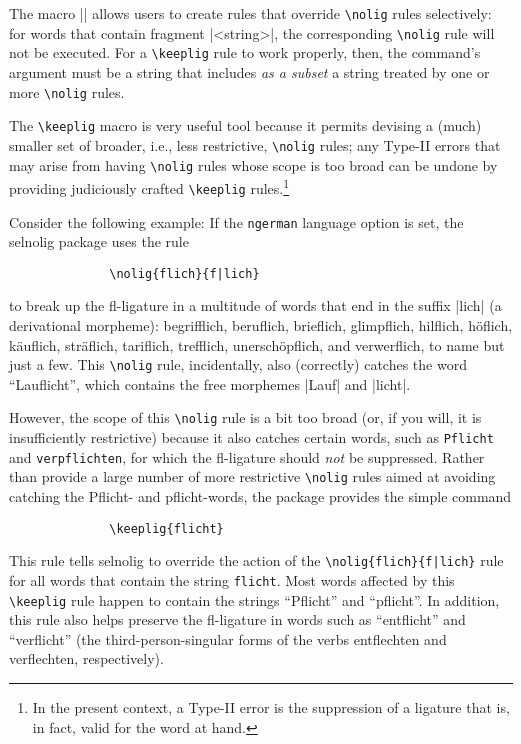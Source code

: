 \documentclass[11pt]{article}
\newcommand{\pkg}[1]{\textsf{#1}}
\newcommand{\opt}[1]{\texttt{#1}}
\newcommand{\cmmd}[1]{\texttt{\textbackslash #1}}
\begin{document}
The macro || allows users to create rules that override \cmmd{nolig} rules selectively: for words that contain fragment |<string>|, the corresponding \cmmd{nolig} rule will not be executed. For a \cmmd{keeplig} rule to work properly, then, the command's argument must be a string that includes \emph{as a subset} a string treated by one or more \cmmd{nolig} rules.

The \cmmd{keeplig} macro is very useful tool because it permits devising a (much) smaller set of broader, i.e., less restrictive, \cmmd{nolig} rules; any Type-II errors that may arise from having \cmmd{nolig} rules whose scope is too broad can be undone by providing judiciously crafted \cmmd{keeplig} rules.\footnote{In the present context, a Type-II error is the suppression of a ligature that is, in fact, valid for the word at hand. }

Consider the following example: If the \opt{ngerman} language option is set, the \pkg{selnolig} package uses the rule 
\begin{Verbatim}
              \nolig{flich}{f|lich}
\end{Verbatim}
to break up the fl-ligature in a multitude of words that end in the suffix |lich| (a derivational morpheme): begrifflich, beruflich, brieflich, glimpflich, hilflich, höflich, käuflich, s\breaklig träflich, tariflich, trefflich, unerschöpflich, and verwerflich, to name but just a few. This \cmmd{nolig} rule, incidentally, also (correctly) catches the word \enquote{Lauflicht}, which contains the free morphemes |Lauf| and |licht|.

However, the scope of this \cmmd{nolig} rule is a bit too broad (or, if you will, it is insufficiently restrictive) because it also catches certain words, such as \opt{Pflicht} and \opt{verpflichten}, for which the fl-ligature should \emph{not} be suppressed. Rather than provide a large number of more restrictive \cmmd{nolig} rules aimed at avoiding catching the Pflicht- and pflicht-words, the package provides the simple command
\begin{Verbatim}
              \keeplig{flicht}
\end{Verbatim}
This rule tells \pkg{selnolig} to override the action of the \Verb+\nolig{flich}{f|lich}+ rule for all words that contain the string \opt{flicht}. Most words affected by this \cmmd{keeplig} rule happen to contain the strings \enquote{Pflicht} and \enquote{pflicht}. In addition, this rule also helps preserve the fl-ligature in words such as \enquote{entflicht} and \enquote{verflicht} (the third-person-singular forms of the verbs entflechten and verflechten, respectively).
\end{document}
